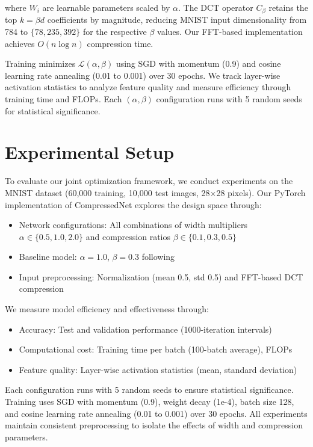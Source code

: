 \documentclass{article} %
\begin{document}
where $W_i$ are learnable parameters scaled by $\alpha$. The DCT operator $C_\beta$ retains the top $k = \beta d$ coefficients by magnitude, reducing MNIST input dimensionality from 784 to $\{78, 235, 392\}$ for the respective $\beta$ values. Our FFT-based implementation achieves $O(n \log n)$ compression time.

Training minimizes $\mathcal{L}(\alpha, \beta)$ using SGD with momentum (0.9) and cosine learning rate annealing (0.01 to 0.001) over 30 epochs. We track layer-wise activation statistics to analyze feature quality and measure efficiency through training time and FLOPs. Each $(\alpha, \beta)$ configuration runs with 5 random seeds for statistical significance.

\section{Experimental Setup}
\label{sec:experimental}

To evaluate our joint optimization framework, we conduct experiments on the MNIST dataset (60,000 training, 10,000 test images, 28$\times$28 pixels). Our PyTorch implementation of CompressedNet explores the design space through:

\begin{itemize}
    \item Network configurations: All combinations of width multipliers $\alpha \in \{0.5, 1.0, 2.0\}$ and compression ratios $\beta \in \{0.1, 0.3, 0.5\}$
    \item Baseline model: $\alpha=1.0$, $\beta=0.3$ following \citet{wang2022learning}
    \item Input preprocessing: Normalization (mean 0.5, std 0.5) and FFT-based DCT compression
\end{itemize}

We measure model efficiency and effectiveness through:
\begin{itemize}
    \item Accuracy: Test and validation performance (1000-iteration intervals)
    \item Computational cost: Training time per batch (100-batch average), FLOPs
    \item Feature quality: Layer-wise activation statistics (mean, standard deviation)
\end{itemize}

Each configuration runs with 5 random seeds to ensure statistical significance. Training uses SGD with momentum (0.9), weight decay (1e-4), batch size 128, and cosine learning rate annealing (0.01 to 0.001) over 30 epochs. All experiments maintain consistent preprocessing to isolate the effects of width and compression parameters.
\end{document}
